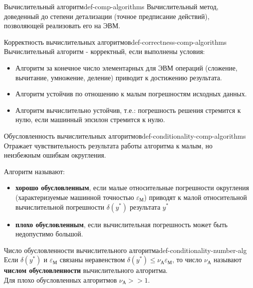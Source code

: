\documentclass[14pt]{extarticle}
\begin{document}
    \begin{definition}{Вычислительный алгоритм}{def-comp-algorithms}
        Вычислительный метод, доведенный до степени детализации (точное предписание действий), позволяющей реализовать его на ЭВМ.
    \end{definition}

    \begin{definition}{Корректность вычислительных алгоритмов}{def-correctness-comp-algorithms}
        Вычислительный алгоритм - корректный, если выполнены условия:
        \begin{itemize}
            \item Алгоритм за конечное число элементарных для ЭВМ операций (сложение, вычитание, умножение, деление) приводит к достижению результата.
            \item Алгоритм устойчив по отношению к малым погрешностям исходных данных.
            \item Алгоритм вычислительно устойчив, т.е.: погрешность решения стремится к нулю, если машинный эпсилон стремится к нулю.
        \end{itemize}
    \end{definition}

    \begin{definition}{Обусловленность вычислительных алгоритмов}{def-conditionality-comp-algorithms}
        Отражает чувствительность результата работы алгоритма к малым, но неизбежным ошибкам округления.
   
        Алгоритм называют:
        \begin{itemize}
            \item \textbf{хорошо обусловленным}, если малые относительные погрешности округления (характеризуемые машинной точностью $\varepsilon_{М}$) приводят к малой относительной вычислительной погрешности $\delta(y^{*})$ результата $y^{*}$
            \item \textbf{плохо обусловленным}, если вычислительная погрешность может быть недопустимо большой.
        \end{itemize}
   
    \end{definition}

    \begin{definition}{Число обусловленности вычислительного алгоритма}{def-conditionality-number-alg}
        Если $\delta(y^{*})$ и $\varepsilon_{М}$ связаны неравенством $\delta(y^{*}) \leq \nu_{А}\varepsilon_{М}$, то число $\nu_{А}$ называют \textbf{числом обусловленности} вычислительного алгоритма.\\
        Для плохо обусловленных алгоритмов $\nu_{А} >> 1$.
    \end{definition}
\end{document}

